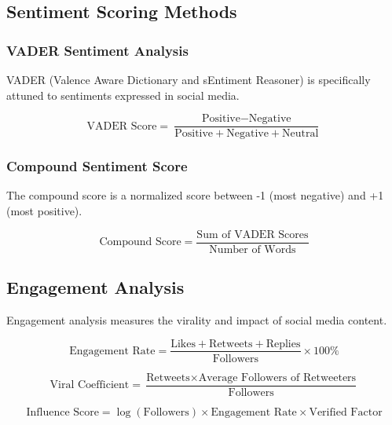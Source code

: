 \documentclass[12pt,a4paper]{article}
\begin{document}
\subsection{Sentiment Scoring Methods}

\subsubsection{VADER Sentiment Analysis}

VADER (Valence Aware Dictionary and sEntiment Reasoner) is specifically attuned to sentiments expressed in social media.

\begin{equation}
\text{VADER Score} = \frac{\text{Positive} - \text{Negative}}{\text{Positive} + \text{Negative} + \text{Neutral}}
\end{equation}

\subsubsection{Compound Sentiment Score}

The compound score is a normalized score between -1 (most negative) and +1 (most positive).

\begin{equation}
\text{Compound Score} = \frac{\text{Sum of VADER Scores}}{\text{Number of Words}}
\end{equation}

\subsection{Engagement Analysis}

Engagement analysis measures the virality and impact of social media content.

\begin{equation}
\text{Engagement Rate} = \frac{\text{Likes} + \text{Retweets} + \text{Replies}}{\text{Followers}} \times 100\%
\end{equation}

\begin{equation}
\text{Viral Coefficient} = \frac{\text{Retweets} \times \text{Average Followers of Retweeters}}{\text{Followers}}
\end{equation}

\begin{equation}
\text{Influence Score} = \log(\text{Followers}) \times \text{Engagement Rate} \times \text{Verified Factor}
\end{equation}
\end{document}
